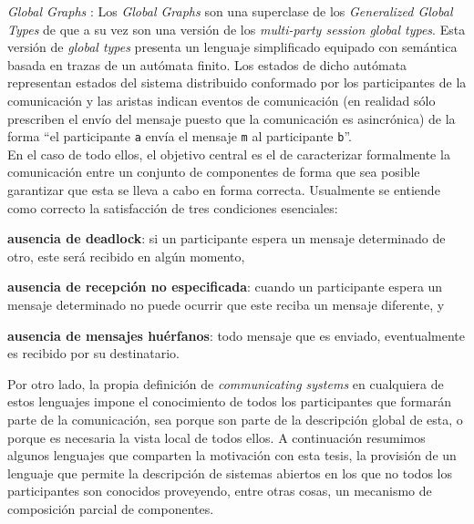 \emph{Global Graphs} \cite{castagna:lmcs-8_1}: Los \emph{Global Graphs} son una superclase de los \emph{Generalized Global Types} de \cite{denielou:esop12} que a su vez son una versión de los \emph{multi-party session global types}. Esta versión de \emph{global types} presenta un lenguaje simplificado equipado con semántica basada en trazas de un autómata finito. Los estados de dicho autómata representan estados del sistema distribuido conformado por los participantes de la comunicación y las aristas indican eventos de comunicación (en realidad sólo prescriben el envío del mensaje puesto que la comunicación es asincrónica) de la forma ``el participante {\tt a} envía el mensaje {\tt m} al participante {\tt b}''.\\

En el caso de todo ellos, el objetivo central es el de caracterizar formalmente la comunicación entre un conjunto de componentes de forma que sea posible garantizar que esta se lleva a cabo en forma correcta. Usualmente se entiende como correcto la satisfacción de tres condiciones esenciales:
\begin{inparaenum}[1)]
\item {\bf ausencia de deadlock}: si un participante espera un mensaje determinado de otro, este será recibido en algún momento, 
\item {\bf ausencia de recepción no especificada}: cuando un participante espera un mensaje determinado no puede ocurrir que este reciba un mensaje diferente, y
\item {\bf ausencia de mensajes huérfanos}: todo mensaje que es enviado, eventualmente es recibido por su destinatario.
\end{inparaenum}

Por otro lado, la propia definición de \emph{communicating systems} en cualquiera de estos lenguajes impone el conocimiento de todos los participantes que formarán parte de la comunicación, sea porque son parte de la descripción global de esta, o porque es necesaria la vista local de todos ellos. A continuación resumimos algunos lenguajes que comparten la motivación con esta tesis, la provisión de un lenguaje que permite la descripción de sistemas abiertos en los que no todos los participantes son conocidos proveyendo, entre otras cosas, un mecanismo de composición parcial de componentes.\\

